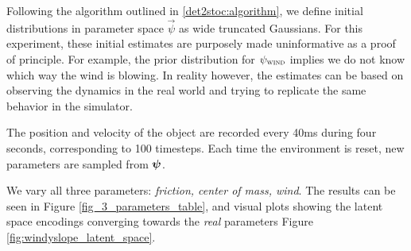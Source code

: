 Following the \dettostoc{} algorithm outlined in \ref{det2stoc:algorithm}, we define initial distributions in parameter space $\vec{\psi}$ as wide truncated Gaussians. For this experiment, these initial estimates are purposely made uninformative as a proof of principle. For example, the prior distribution for $\psi_{\textsc{wind}}$ implies we do not know which way the wind is blowing. In reality however, the estimates can be based on observing the dynamics in the real world and trying to replicate the same behavior in the simulator.

The position and velocity of the object are recorded every 40ms during four seconds, corresponding to 100 timesteps. Each time the environment is reset, new parameters are sampled from $\boldsymbol{\psi}$.


We vary all three parameters: \textit{friction, center of mass, wind}. The results can be seen in Figure \ref{fig_3_parameters_table}, and visual plots showing the latent space encodings converging towards the \emph{real} parameters Figure \ref{fig:windyslope_latent_space}.





